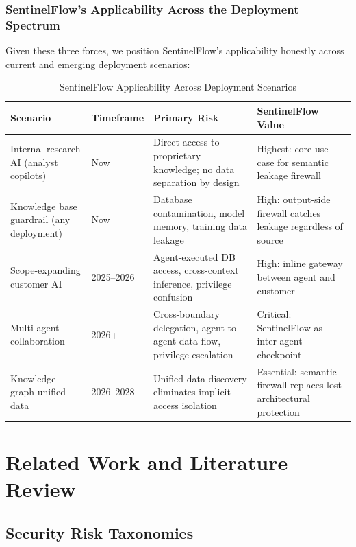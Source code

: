 \documentclass[12pt,a4paper]{article}
\begin{document}
\subsubsection{SentinelFlow's Applicability Across the Deployment Spectrum}

Given these three forces, we position SentinelFlow's applicability honestly across current and emerging deployment scenarios:

\begin{table}[H]
\centering
\caption{SentinelFlow Applicability Across Deployment Scenarios}
\label{tab:applicability}
\small
\begin{tabular}{p{3cm}p{2cm}p{4cm}p{4cm}}
\toprule
\textbf{Scenario} & \textbf{Timeframe} & \textbf{Primary Risk} & \textbf{SentinelFlow Value} \\
\midrule
Internal research AI (analyst copilots) & Now & Direct access to proprietary knowledge; no data separation by design & Highest: core use case for semantic leakage firewall \\
\midrule
Knowledge base guardrail (any deployment) & Now & Database contamination, model memory, training data leakage & High: output-side firewall catches leakage regardless of source \\
\midrule
Scope-expanding customer AI & 2025--2026 & Agent-executed DB access, cross-context inference, privilege confusion & High: inline gateway between agent and customer \\
\midrule
Multi-agent collaboration & 2026+ & Cross-boundary delegation, agent-to-agent data flow, privilege escalation & Critical: SentinelFlow as inter-agent checkpoint \\
\midrule
Knowledge graph-unified data & 2026--2028 & Unified data discovery eliminates implicit access isolation & Essential: semantic firewall replaces lost architectural protection \\
\bottomrule
\end{tabular}
\end{table}


\section{Related Work and Literature Review}
\label{sec:related}

\subsection{Security Risk Taxonomies}
\end{document}

